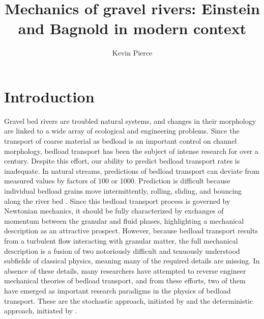 \documentclass{article}
\begin{document}
\title{Mechanics of gravel rivers: Einstein and Bagnold in modern context}
\author{Kevin Pierce}
\maketitle


\section{Introduction}
Gravel bed rivers are troubled natural systems, and changes in their morphology are linked to a wide array of ecological and engineering problems.
Since the transport of coarse material as bedload is an important control on channel morphology, bedload transport has been the subject of intense research for over a century. 
Despite this effort, our ability to predict bedload transport rates is inadequate.  
In natural streams, predictions of bedload transport can deviate from measured values by factors of 100 or 1000. 
Prediction is difficult because individual bedload grains move intermittently, rolling, sliding, and bouncing along the river bed \citep{Einstein1950, Bagnold1973}. 
Since this bedload transport process is governed by Newtonian mechanics, it should be fully characterized by exchanges of momentum between the granular and fluid phases, highlighting a mechanical description as an attractive prospect.
However, because bedload transport results from a turbulent flow interacting with granular matter, the full mechanical description is a fusion of two notoriously difficult and tenuously understood subfields of classical physics, meaning many of the required details are missing.
In absence of these details, many researchers have attempted to reverse engineer mechanical theories of bedload transport, and from these efforts, two of them have emerged as important research paradigms in the physics of bedload transport. 
These are the stochastic approach, initiated by \citet{Einstein1937, Einstein1950, Einstein1964} and the deterministic approach, initiated by \citet{Bagnold1956, Bagnold1966, Bagnold1973}. 
\end{document}
